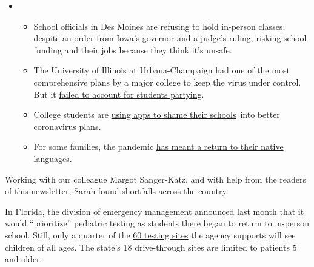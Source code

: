 \begin{itemize}
\item
  \begin{itemize}
  \tightlist
  \item
    School officials in Des Moines are refusing to hold in-person
    classes,
    \href{https://www.nytimes3xbfgragh.onion/2020/09/10/us/des-moines-school-opening-coronavirus.html?action=click\&pgtype=Article\&state=default\&region=MAIN_CONTENT_3\&context=storylines_keepup}{despite
    an order from Iowa's governor and a judge's ruling}, risking school
    funding and their jobs because they think it's unsafe.
  \item
    The University of Illinois at Urbana-Champaign had one of the most
    comprehensive plans by a major college to keep the virus under
    control. But it
    \href{https://www.nytimes3xbfgragh.onion/2020/09/10/health/university-illinois-covid.html?action=click\&pgtype=Article\&state=default\&region=MAIN_CONTENT_3\&context=storylines_keepup}{failed
    to account for students partying}.
  \item
    College students are
    \href{https://www.nytimes3xbfgragh.onion/2020/09/10/technology/coronavirus-quarantines-college.html?action=click\&pgtype=Article\&state=default\&region=MAIN_CONTENT_3\&context=storylines_keepup}{using
    apps to shame their schools}~into better coronavirus plans.
  \item
    For some families, the pandemic
    \href{https://www.nytimes3xbfgragh.onion/2020/09/10/parenting/family-second-language-coronavirus.html?action=click\&pgtype=Article\&state=default\&region=MAIN_CONTENT_3\&context=storylines_keepup}{has
    meant a return to their native languages}.
  \end{itemize}
\end{itemize}

Working with our colleague Margot Sanger-Katz, and with help from the
readers of this newsletter, Sarah found shortfalls across the country.

In Florida, the division of emergency management announced last month
that it would ``prioritize'' pediatric testing as students there began
to return to in-person school. Still, only a quarter of the
\href{https://www.floridadisaster.org/news-media/news/20200803-state-of-florida-prioritizes-symptomatic-vulnerable-and-pediatric-populations-at-state-supported-covid-19-testing-sites/}{60
testing sites} the agency supports will see children of all ages. The
state's 18 drive-through sites are limited to patients 5 and older.

